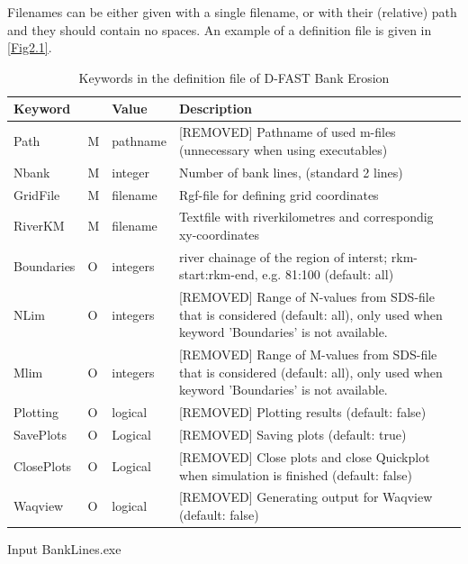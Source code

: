 Filenames can be either given with a single filename, or with their (relative) path and they should contain no spaces.
An example of a definition file is given in \autoref{Fig2.1}.

\begin{table}
\begin{tabular}{lllp{5cm}}
Keyword &  & Value & Description \\ \hline
Path & M & pathname & [REMOVED] Pathname of used m-files (unnecessary when using executables) \\
Nbank & M & integer & Number of bank lines, (standard 2 lines) \\
GridFile  & M & filename & Rgf-file for defining grid coordinates \\
RiverKM & M & filename & Textfile with riverkilometres and correspondig xy-coordinates \\
Boundaries  & O & integers & river chainage of the region of interst;  rkm-start:rkm-end, e.g. 81:100 (default: all) \\
NLim & O & integers & [REMOVED] Range of N-values from SDS-file that is considered (default: all), only used when keyword 'Boundaries' is not available. \\
Mlim & O & integers & [REMOVED] Range of M-values from SDS-file that is considered (default: all), only used when keyword 'Boundaries' is not available. \\
Plotting & O & logical & [REMOVED] Plotting results (default: false) \\
SavePlots & O & Logical & [REMOVED] Saving plots (default: true) \\
ClosePlots & O & Logical & [REMOVED] Close plots and close Quickplot when simulation is finished (default: false) \\
Waqview & O & logical & [REMOVED] Generating output for Waqview (default: false) \\ \hline
\end{tabular}
\caption{Keywords in the definition file of D-FAST Bank Erosion}
\label{Tab2.2}
\end{table}

Input BankLines.exe

